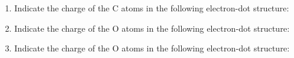 \documentclass[main.tex]{subfiles}
\begin{document}
\begin{multicols*}{2}
\begin{enumerate}
\item Indicate the charge of the C atoms in the following electron-dot structure:\\
\begin{center}
\end{center}
\begin{enumerate}[label=(\alph*)]
\end{enumerate}

\item Indicate the charge of the O atoms in the following electron-dot structure:\\
\begin{center}
\end{center}
\begin{enumerate}[label=(\alph*)]
\end{enumerate}

\item Indicate the charge of the O atoms in the following electron-dot structure:\\
\begin{center}
\end{center}
\begin{enumerate}[label=(\alph*)]
\end{enumerate}


\end{enumerate}
\end{multicols*}
\end{document}
